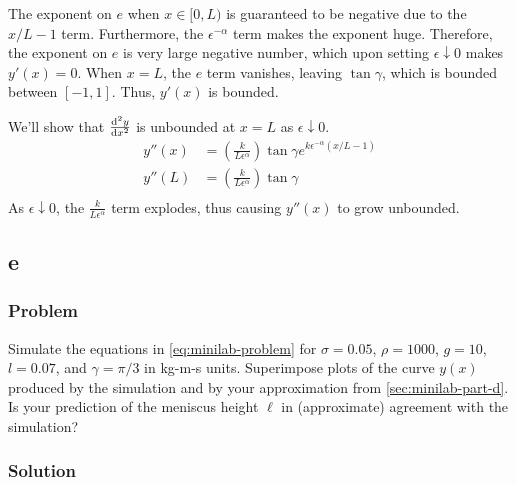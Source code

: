 \documentclass[12pt,twoside]{article}
\begin{document}
The exponent on $e$ when $x\in[0,L)$ is guaranteed to be negative due to the
$x/L-1$ term. Furthermore, the $\epsilon^{-\alpha}$ term makes the exponent
huge. Therefore, the exponent on $e$ is very large negative number, which upon
setting $\epsilon\downarrow0$ makes $y'(x)=0$. When $x=L$, the $e$ term
vanishes, leaving $\tan\gamma$, which is bounded between $[-1,1]$. Thus, $y'(x)$
is bounded.

We'll show that $\od[2]{y}{x}$ is unbounded at $x=L$ as $\epsilon\downarrow0$.
\begin{equation*}
  \begin{aligned}
    y''(x) &= \left( \frac{k}{L\epsilon^{\alpha}} \right)\tan\gamma
    e^{k\epsilon^{-\alpha}(x/L-1)} \\
    y''(L) &= \left( \frac{k}{L\epsilon^{\alpha}} \right)\tan\gamma \\
  \end{aligned}
\end{equation*}
As $\epsilon\downarrow0$, the $\frac{k}{L\epsilon^{\alpha}}$ term explodes, thus
causing $y''(x)$ to grow unbounded.

\subsection{e}
\subsubsection*{Problem}
Simulate the equations in \cref{eq:minilab-problem} for $\sigma=0.05$,
$\rho=1000$, $g=10$, $l=0.07$, and $\gamma=\pi/3$ in kg-m-s units. Superimpose
plots of the curve $y(x)$ produced by the simulation and by your approximation
from \cref{sec:minilab-part-d}. Is your prediction of the meniscus height $\ell$
in (approximate) agreement with the simulation?
\subsubsection*{Solution}
\todo{}
\end{document}
